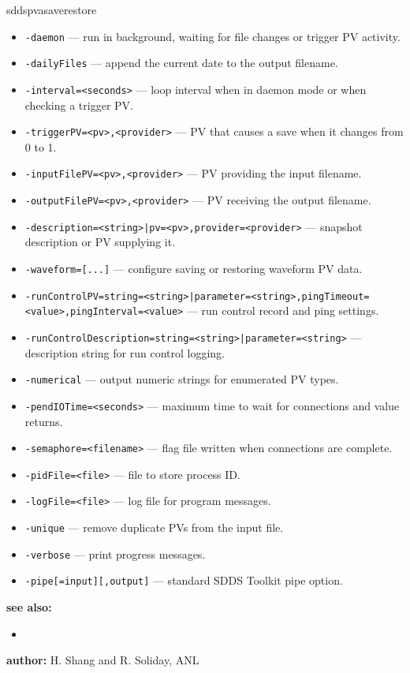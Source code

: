 \begin{sddsprog}{sddspvasaverestore}
\begin{itemize}
  \item {\tt -daemon} --- run in background, waiting for file changes or trigger PV activity.
  \item {\tt -dailyFiles} --- append the current date to the output filename.
  \item {\tt -interval=<seconds>} --- loop interval when in daemon mode or when checking a trigger PV.
  \item {\tt -triggerPV=<pv>,<provider>} --- PV that causes a save when it changes from 0 to 1.
  \item {\tt -inputFilePV=<pv>,<provider>} --- PV providing the input filename.
  \item {\tt -outputFilePV=<pv>,<provider>} --- PV receiving the output filename.
  \item {\tt -description=<string>|pv=<pv>,provider=<provider>} --- snapshot description or PV supplying it.
  \item {\tt -waveform=[...]} --- configure saving or restoring waveform PV data.
  \item {\tt -runControlPV={string=<string>|parameter=<string>},pingTimeout=<value>,pingInterval=<value>} --- run control record and ping settings.
  \item {\tt -runControlDescription={string=<string>|parameter=<string>}} --- description string for run control logging.
  \item {\tt -numerical} --- output numeric strings for enumerated PV types.
  \item {\tt -pendIOTime=<seconds>} --- maximum time to wait for connections and value returns.
  \item {\tt -semaphore=<filename>} --- flag file written when connections are complete.
  \item {\tt -pidFile=<file>} --- file to store process ID.
  \item {\tt -logFile=<file>} --- log file for program messages.
  \item {\tt -unique} --- remove duplicate PVs from the input file.
  \item {\tt -verbose} --- print progress messages.
  \item {\tt -pipe[=input][,output]} --- standard SDDS Toolkit pipe option.
  \end{itemize}
\item \textbf{see also:}
  \begin{itemize}
  \item {}
  \end{itemize}
\item \textbf{author:} H. Shang and R. Soliday, ANL
\end{sddsprog}

